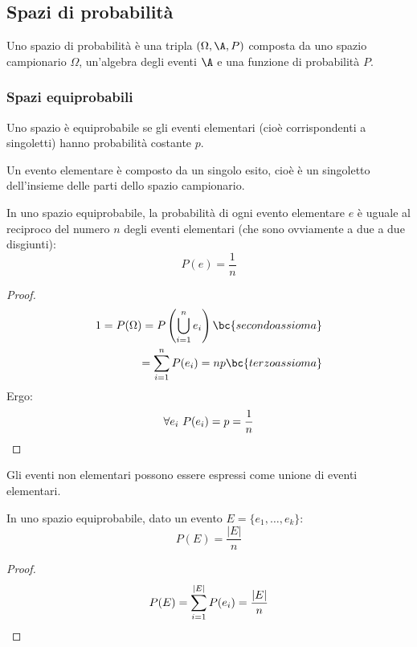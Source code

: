 \subsection{Spazi di probabilità}
\begin{defin}
	Uno spazio di probabilità è una tripla $(\Omega,\A,P)$ composta da uno spazio campionario $\Omega$, un'algebra degli eventi $\A$ e una funzione di probabilità $P$.
\end{defin}


\subsubsection{Spazi equiprobabili}
\begin{defin}
	Uno spazio è equiprobabile se gli eventi elementari (cioè corrispondenti a singoletti) hanno probabilità costante $p$.
\end{defin}

Un evento elementare è composto da un singolo esito, cioè è un singoletto dell'insieme delle parti dello spazio campionario.
\begin{teor}
	In uno spazio equiprobabile, la probabilità di ogni evento elementare $e$ è uguale al reciproco del numero $n$ degli eventi elementari (che sono ovviamente a due a due disgiunti):
	\begin{equation}
		P(e)=\frac{1}{n}
	\end{equation}
\end{teor}
\begin{proof}
	\begin{align*}
		1=P(\Omega)=P\left( \bigcup_{i=1}^n e_i \right) \bc{secondo assioma} \\
		=\sum_{i=1}^n P(e_i) = np \bc{terzo assioma}                         \\
	\end{align*}
	Ergo:
	\begin{equation*}
		\forall e_i ~ P(e_i)=p=\frac{1}{n} \qedhere
	\end{equation*}
\end{proof}

Gli eventi non elementari possono essere espressi come unione di eventi elementari.
\begin{teor}
	In uno spazio equiprobabile, dato un evento $E=\{e_1,\dots,e_k\}$:
	\begin{equation}
		P(E)=\frac{|E|}{n}
	\end{equation}
\end{teor}
\begin{proof}
	\begin{equation*}
		P(E)= \sum_{i=1}^{|E|} P(e_i) = \frac{|E|}{n} \qedhere
	\end{equation*}
\end{proof}

